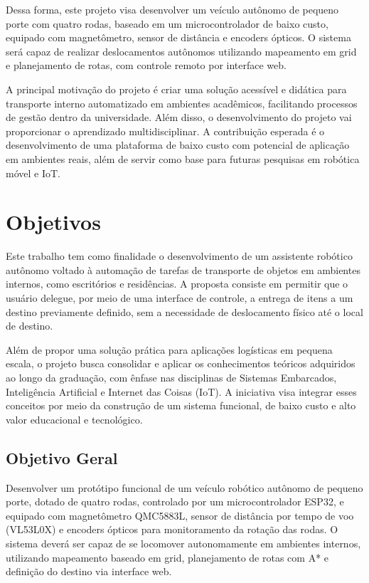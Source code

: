 \documentclass[	12pt, Times, openright, twoside, a4paper, english, brazil]{abntex2}
\begin{document}
Dessa forma, este projeto visa desenvolver um veículo autônomo de pequeno porte com quatro rodas, baseado em um microcontrolador de baixo custo, equipado com magnetômetro, sensor de distância e encoders ópticos. O sistema será capaz de realizar deslocamentos autônomos utilizando mapeamento em grid e planejamento de rotas, com controle remoto por interface web.

A principal motivação do projeto é criar uma solução acessível e didática para transporte interno automatizado em ambientes acadêmicos, facilitando processos de gestão dentro da universidade. Além disso, o desenvolvimento do projeto vai proporcionar o aprendizado multidisciplinar. A contribuição esperada é o desenvolvimento de uma plataforma de baixo custo com potencial de aplicação em ambientes reais, além de servir como base para futuras pesquisas em robótica móvel e IoT.

\section{Objetivos}

Este trabalho tem como finalidade o desenvolvimento de um assistente robótico autônomo voltado à automação de tarefas de transporte de objetos em ambientes internos, como escritórios e residências. A proposta consiste em permitir que o usuário delegue, por meio de uma interface de controle, a entrega de itens a um destino previamente definido, sem a necessidade de deslocamento físico até o local de destino.

Além de propor uma solução prática para aplicações logísticas em pequena escala, o projeto busca consolidar e aplicar os conhecimentos teóricos adquiridos ao longo da graduação, com ênfase nas disciplinas de Sistemas Embarcados, Inteligência Artificial e Internet das Coisas (IoT). A iniciativa visa integrar esses conceitos por meio da construção de um sistema funcional, de baixo custo e alto valor educacional e tecnológico.

\subsection{Objetivo Geral}

Desenvolver um protótipo funcional de um veículo robótico autônomo de pequeno porte, dotado de quatro rodas, controlado por um microcontrolador ESP32, e equipado com magnetômetro QMC5883L, sensor de distância por tempo de voo (VL53L0X) e encoders ópticos para monitoramento da rotação das rodas. O sistema deverá ser capaz de se locomover autonomamente em ambientes internos, utilizando mapeamento baseado em grid, planejamento de rotas com A* e definição do destino via interface web.
\end{document}
